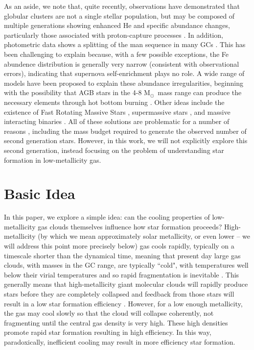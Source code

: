 \documentclass[useAMS,usenatbib]{mn2e}
\newcommand{\msun}{{M$_\odot$}}
\begin{document}
As an aside, we note that, quite recently, observations have demonstrated that globular clusters are not a single stellar population, but may be composed of multiple generations showing enhanced He and specific abundance changes, particularly those associated with proton-capture processes \citep[e.g.,][]{Norris1981, Kraft1994, Gratton2001, Carretta2009}.  In addition, photometric data shows a splitting of the man sequence in many GCs \citet[e.g.,][]{Piotto2009, Anderson2009, Milone2010}.  This has been challenging to explain because, with a few possible exceptions, the Fe abundence distribution is generally very narrow (consistent with observational errors), indicating that supernova self-enrichment plays no role.  A wide range of models have been proposed to explain these abundance irregularities, beginning with the possibility that AGB stars in the 4-8 \msun\ mass range can produce the necessary elements through hot bottom burning \citep[e.g.,][]{DErcole2010, Ventura2013}.  Other ideas include the existence of Fast Rotating Massive Stars \citep[FRMS][]{Krause2013}, supermassive stars \citep{Denissenkov2014,  Denissenkov2015}, and massive interacting binaries \citet[e.g.,][]{deMink2009, Bastian2013}.  All of these solutions are problematic for a number of reasons \citep[e.g.,][]{Renzini2015, Bastian2015}, including the mass budget required to generate the observed number of second generation stars.  However, in this work, we will not explicitly explore this second generation, instead focusing on the problem of understanding star formation in low-metallicity gas.


%
\section{Basic Idea}
\label{sec:basic}

In this paper, we explore a simple idea: can the cooling properties of low-metallicity gas clouds themselves influence how star formation proceeds?  High-metallicity (by which we mean approximately solar metallicity, or even lower -- we will address this point more precisely below) gas cools rapidly, typically on a timescale shorter than the dynamical time, meaning that present day large gas clouds, with masses in the GC range, are typically ``cold", with temperatures well below their virial temperatures and so rapid fragmentation is inevitable \citep{Hoyle1953}.  This generally means that high-metallicity giant molecular clouds will rapidly produce stars before they are completely collapsed and feedback from those stars will result in a low star formation efficiency \citep[e.g.,][]{McKee1989}.  However, for a low enough metallicity, the gas may cool slowly so that the cloud will collapse coherently, not fragmenting until the central gas density is very high.  These high densities promote rapid star formation resulting in high efficiency.  In this way, paradoxically, inefficient cooling may result in more efficiency star formation. 
\end{document}
